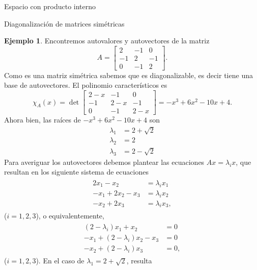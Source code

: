 \documentclass[a4paper,12pt,twoside,spanish,reqno]{amsbook}
\theoremstyle{definition}
\newtheorem{ejemplo}{Ejemplo}[section]
\theoremstyle{remark}
\begin{document}
\begin{chapter}{Espacio con producto interno}
\begin{section}{Diagonalización de matrices simétricas}
    \begin{ejemplo} Encontremos autovalores y autovectores de  la matriz
        \begin{equation*}
            A = \begin{bmatrix} 2&-1&0\\-1&2&-1\\0&-1&2 \end{bmatrix}.
        \end{equation*}
        Como es una matriz simétrica sabemos que es diagonalizable, es decir tiene una base de autovectores. 
        El polinomio característicos es
        \begin{equation*}
            \chi_A(x) = \det  \begin{bmatrix} 2-x&-1&0\\-1&2-x&-1\\0&-1&2-x \end{bmatrix} =	-x^3 + 6 x^2 - 10 x + 4.
        \end{equation*}
        Ahora bien, las raíces de $-x^3 + 6 x^2 - 10 x + 4 $  son 
        \begin{align*}
            \lambda_1 &= 2 + \sqrt 2 \\
            \lambda_2 &= 2 \\
            \lambda_3 &= 2 - \sqrt 2
        \end{align*}
        Para averiguar los autovectores debemos plantear las ecuaciones $Ax = \lambda_ix$,  que resultan en los siguiente sistema de ecuaciones
        \begin{align*}
        \begin{split}
        2x_1 - x_2  &= \lambda_i x_1 \\
        -x_1 + 2x_2 -x_3 &=\lambda_ix_2 \\
        -x_2 + 2x_3 &= \lambda_ix_3,  
        \end{split}
        \end{align*}
        ($i=1,2,3$),  o equivalentemente,
        \begin{align*}
        \begin{split}
        (2 -\lambda_i)x_1+ x_2  &= 0 \\
        -x_1 +(2-\lambda_i)x_2  -x_3 &=0 \\
        -x_2 + (2-\lambda_i)x_3 &= 0,  
        \end{split}
        \end{align*}
        ($i=1,2,3$).
        En el caso de $\lambda_1= 2 + \sqrt 2$,  resulta
        \begin{align*}

\end{align*}
\end{ejemplo}
\end{section}
\end{chapter}
\end{document}
